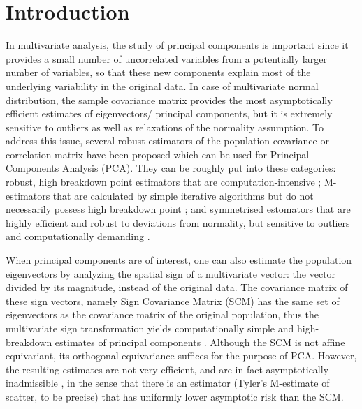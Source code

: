 \documentclass[fleqn,11pt]{article}
\begin{document}
\section{Introduction}
In multivariate analysis, the study of principal components is important since it provides a small number of uncorrelated variables from a potentially larger number of variables, so that these new components explain most of the underlying variability in the original data. In case of multivariate normal distribution, the sample covariance matrix provides the most asymptotically efficient estimates of eigenvectors/ principal components, but it is extremely sensitive to outliers as well as relaxations of the normality assumption. To address this issue, several robust estimators of the population covariance or correlation matrix have been proposed which can be used for Principal Components Analysis (PCA). They can be roughly put into these categories: robust, high breakdown point estimators that are computation-intensive \citep{rousseeuw85, maronna76}; M-estimators that are calculated by simple iterative algorithms but do not necessarily possess high breakdown point \citep{huber77, tyler87}; and symmetrised estomators that are highly efficient and robust to deviations from normality, but sensitive to outliers and computationally demanding \citep{dumbgen98, sirkia07}.

When principal components are of interest, one can also estimate the population eigenvectors by analyzing the spatial sign of a multivariate vector: the vector divided by its magnitude, instead of the original data. The covariance matrix of these sign vectors, namely Sign Covariance Matrix (SCM) has the same set of eigenvectors as the covariance matrix of the original population, thus the multivariate sign transformation yields computationally simple and high-breakdown estimates of principal components \citep{locantore99, visuri00}. Although the SCM is not affine equivariant, its orthogonal equivariance suffices for the purpose of PCA. However, the resulting estimates are not very efficient, and are in fact asymptotically inadmissible \citep{magyar14}, in the sense that there is an estimator (Tyler's M-estimate of scatter, to be precise) that has uniformly lower asymptotic risk than the SCM.
\end{document}
